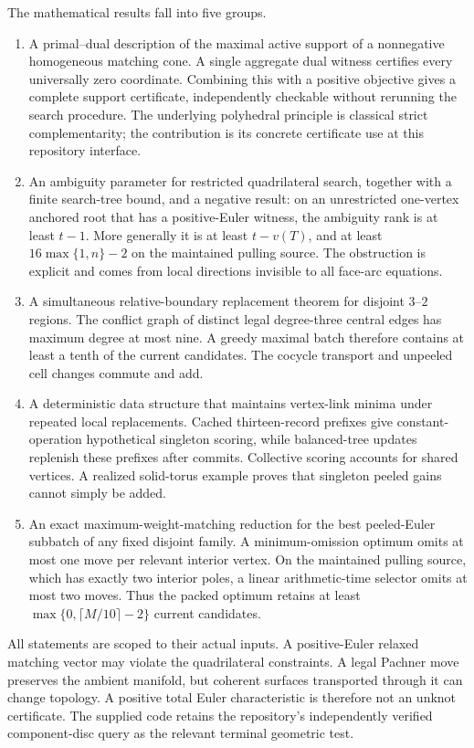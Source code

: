 The mathematical results fall into five groups.
\begin{enumerate}
\item A primal--dual description of the maximal active support of a
nonnegative homogeneous matching cone. A single aggregate dual witness
certifies every universally zero coordinate. Combining this with a
positive objective gives a complete support certificate, independently
checkable without rerunning the search procedure. The underlying
polyhedral principle is classical strict complementarity; the contribution
is its concrete certificate use at this repository interface.
\item An ambiguity parameter for restricted quadrilateral search, together
with a finite search-tree bound, and a negative result: on an unrestricted
one-vertex anchored root that has a positive-Euler witness, the ambiguity
rank is at least $t-1$. More generally it is at least $t-v(T)$,
and at least $16\max\{1,n\}-2$ on the maintained pulling source. The obstruction is explicit and comes from local
directions invisible to all face-arc equations.
\item A simultaneous relative-boundary replacement theorem for disjoint
$3$--$2$ regions. The conflict graph of distinct legal degree-three central
edges has maximum degree at most nine. A greedy maximal batch therefore
contains at least a tenth of the current candidates. The cocycle transport
and unpeeled cell changes commute and add.
\item A deterministic data structure that maintains vertex-link minima
under repeated local replacements. Cached thirteen-record prefixes give
constant-operation hypothetical singleton scoring, while balanced-tree
updates replenish these prefixes after commits. Collective scoring accounts
for shared vertices. A realized solid-torus example proves that singleton
peeled gains cannot simply be added.
\item An exact maximum-weight-matching reduction for the best peeled-Euler
subbatch of any fixed disjoint family. A minimum-omission optimum omits
at most one move per relevant interior vertex. On the maintained pulling
source, which has exactly two interior poles, a linear arithmetic-time
selector omits at most two moves. Thus the packed optimum retains at least
$\max\{0,\lceil M/10\rceil-2\}$ current candidates.
\end{enumerate}

All statements are scoped to their actual inputs. A positive-Euler relaxed
matching vector may violate the quadrilateral constraints. A legal Pachner
move preserves the ambient manifold, but coherent surfaces transported
through it can change topology. A positive total Euler characteristic is
therefore not an unknot certificate. The supplied code retains the
repository's independently verified component-disc query as the relevant
terminal geometric test.

